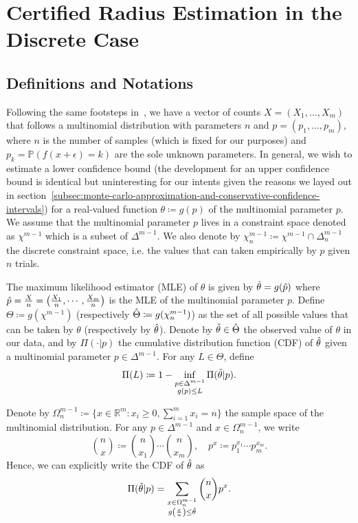 \section{Certified Radius Estimation in the Discrete Case}\label{sec:discrete}

\subsection{Definitions and Notations}\label{subsec:definitions-and-notations}
Following the same footsteps in~\citep{batterton2021confidence}, we have a vector of counts $X = (X_1, \ldots, X_m)$ that follows a multinomial distribution with parameters $n$ and $p = (p_1, \ldots, p_m)$, where $n$ is the number of samples (which is fixed for our purposes) and $p_k = \mathbb{P}(f(x + \epsilon) = k)$ are the sole unknown parameters.
In general, we wish to estimate a lower confidence bound (the development for an upper confidence bound is identical but uninteresting for our intents given the reasons we layed out in section~\ref{subsec:monte-carlo-approximation-and-conservative-confidence-intervals}) for a real-valued function $\theta\coloneqq g(p)$ of the multinomial parameter $p$.
We assume that the multinomial parameter $p$ lives in a constraint space denoted as $\chi^{m-1}$ which is a subset of $\Delta^{m-1}$.
We also denote by $\chi^{m-1}_n\coloneqq\chi^{m-1}\cap\Delta^{m-1}_n$ the discrete constraint space, i.e. the values that can taken empirically by $p$ given $n$ trials.

The maximum likelihood estimator (MLE) of $\theta$ is given by $\Hat{\theta}=g(\Hat{p})$ where $\Hat{p} = \frac{X}{n}=\left(\frac{X_1}{n}, \cdots, \frac{X_m}{n}\right)$ is the MLE of the multinomial parameter $p$.
Define $\Theta\coloneqq g(\chi^{m-1})$ (respectively $\Hat{\Theta}\coloneqq g(\chi^{m-1}_n)$) as the set of all possible values that can be taken by $\theta$ (respectively by $\Hat{\theta}$).
Denote by $\Tilde{\theta}\in\Hat{\Theta}$ the observed value of $\theta$ in our data, and by $\Pi(\cdot|p)$ the cumulative distribution function (CDF) of $\Hat{\theta}$ given a multinomial parameter $p\in\Delta^{m-1}$.
For any $L\in\Theta$, define
\begin{equation}
    \Pi(L)\coloneqq1-\inf_{\substack{p\in\Delta^{m-1}\\g(p)\leq L}}\Pi(\Tilde{\theta}|p).\label{eq:Pi}
\end{equation}

Denote by $\Omega^{m-1}_n\coloneqq\{x\in\mathbb{R}^m : x_i\geq0,\sum_{i=1}^m x_i = n\}$ the sample space of the multinomial distribution.
For any $p\in\Delta^{m-1}$ and $x\in\Omega^{m-1}_n$, we write
\[
    \binom{n}{x}\coloneqq\binom{n}{x_1}\cdots\binom{n}{x_m},\quad p^x\coloneqq p_1^{x_1}\cdots p_m^{x_m}.
\]
Hence, we can explicitly write the CDF of $\Hat{\theta}$ as
\[
    \Pi(\Tilde{\theta}|p) = \sum_{\substack{x\in\Omega^{m-1}_n\\g\left(\frac{x}{n}\right)\leq\Tilde{\theta}}}\binom{n}{x}p^x.
\]

